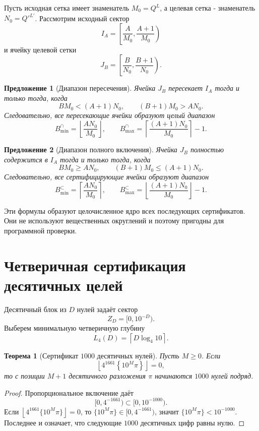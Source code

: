\documentclass[11pt,a4paper]{article}
\newtheorem{proposition}{Предложение}
\newtheorem{theorem}{Теорема}
\newcommand{\fracpart}[1]{\left\{#1\right\}}
\newcommand{\floor}[1]{\left\lfloor #1 \right\rfloor}
\begin{document}
Пусть исходная сетка имеет знаменатель $M_0=Q^L$, а целевая сетка - знаменатель $N_0=Q'^{L'}$.  Рассмотрим исходный сектор
\[
  I_A=\left[\frac{A}{M_0},\frac{A+1}{M_0}\right)
\]
и ячейку целевой сетки
\[
  J_B=\left[\frac{B}{N_0},\frac{B+1}{N_0}\right).
\]

\begin{proposition}[Диапазон пересечения]
Ячейка $J_B$ пересекает $I_A$ тогда и только тогда, когда
\[
  B M_0 < (A+1)N_0,
  \qquad
  (B+1)M_0 > A N_0.
\]
Следовательно, все пересекающие ячейки образуют целый диапазон
\[
  B_{\min}^{\cap}=\left\lfloor\frac{A N_0}{M_0}\right\rfloor,
  \qquad
  B_{\max}^{\cap}=\left\lceil\frac{(A+1)N_0}{M_0}\right\rceil-1.
\]
\end{proposition}

\begin{proposition}[Диапазон полного включения]
Ячейка $J_B$ полностью содержится в $I_A$ тогда и только тогда, когда
\[
  B M_0\ge A N_0,
  \qquad
  (B+1)M_0\le (A+1)N_0.
\]
Следовательно, все сертифицирующие ячейки образуют диапазон
\[
  B_{\min}^{\subset}=\left\lceil\frac{A N_0}{M_0}\right\rceil,
  \qquad
  B_{\max}^{\subset}=\left\lfloor\frac{(A+1)N_0}{M_0}\right\rfloor-1.
\]
\end{proposition}

Эти формулы образуют целочисленное ядро всех последующих сертификатов.  Они не используют вещественных округлений и поэтому пригодны для программной проверки.

\section{Четверичная сертификация десятичных целей}

Десятичный блок из $D$ нулей задаёт сектор
\[
  Z_D=[0,10^{-D}).
\]
Выберем минимальную четверичную глубину
\[
  L_4(D)=\left\lceil D\log_4 10\right\rceil.
\]

\begin{theorem}[Сертификат $1000$ десятичных нулей]
Пусть $M\ge0$.  Если
\[
  \floor{4^{1661}\fracpart{10^M\pi}}=0,
\]
то с позиции $M+1$ десятичного разложения $\pi$ начинаются $1000$ нулей подряд.
\end{theorem}

\begin{proof}
Пропорциональное включение даёт
\[
  [0,4^{-1661})\subset[0,10^{-1000}).
\]
Если $\floor{4^{1661}\{10^M\pi\}}=0$, то $\{10^M\pi\}\in[0,4^{-1661})$, значит $\{10^M\pi\}<10^{-1000}$. Последнее и означает, что следующие $1000$ десятичных цифр равны нулю.
\end{proof}
\end{document}
